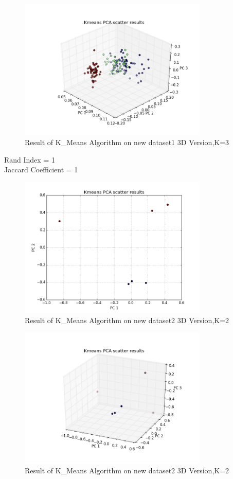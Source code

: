 \documentclass[paper=letter, fontsize=11pt]{article}
\numberwithin{equation}{section}		%
\numberwithin{figure}{section}			%
\numberwithin{table}{section}				%
\begin{document}
\begin{figure}[H]
	\centering
	\includegraphics[width=0.8\textwidth]{K_new_dataset_1_3D}
	\caption{Result of K\_Means Algorithm on new dataset1 3D Version,K=3}
\end{figure}
\noindent Rand Index = 1\\
Jaccard Coefficient = 1\\
\begin{figure}[H]
	\centering
	\includegraphics[width=0.8\textwidth]{K_new_dataset_2_2D}
	\caption{Result of K\_Means Algorithm on new dataset2 3D Version,K=2}
\end{figure}
\begin{figure}[H]
	\centering
	\includegraphics[width=0.8\textwidth]{K_new_dataset_2_3D}
	\caption{Result of K\_Means Algorithm on new dataset2 3D Version,K=2}
\end{figure}
\end{document}
